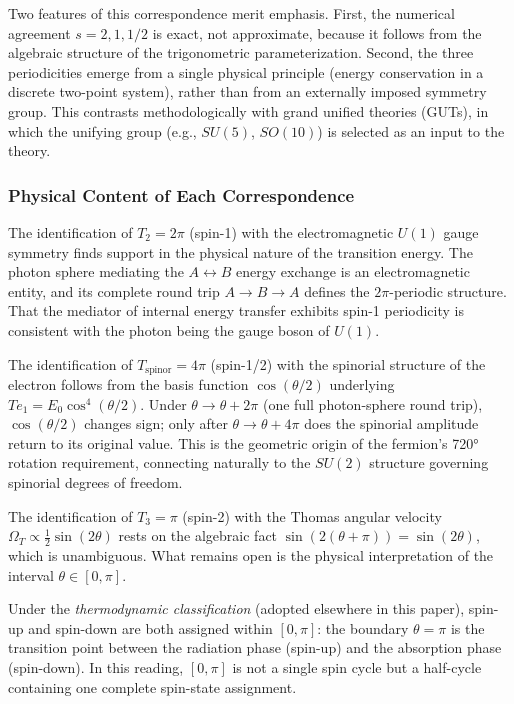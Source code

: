 \documentclass[%
 reprint,
 amsmath,amssymb,
 aps,
 prb,
]{revtex4-2}
\numberwithin{equation}{section}
\theoremstyle{definition}
\theoremstyle{remark}
\newcommand{\Uone}{U(1)}
\begin{document}
Two features of this correspondence merit emphasis. First, the numerical agreement $s = 2, 1, 1/2$ is exact, not approximate, because it follows from the algebraic structure of the trigonometric parameterization. Second, the three periodicities emerge from a single physical principle (energy conservation in a discrete two-point system), rather than from an externally imposed symmetry group. This contrasts methodologically with grand unified theories (GUTs), in which the unifying group (e.g., $SU(5)$, $SO(10)$) is selected as an input to the theory.

\subsubsection{Physical Content of Each Correspondence}

The identification of $T_2 = 2\pi$ (spin-1) with the electromagnetic $\Uone$ gauge symmetry finds support in the physical nature of the transition energy. The photon sphere mediating the $A \leftrightarrow B$ energy exchange is an electromagnetic entity, and its complete round trip $A\to B\to A$ defines the $2\pi$-periodic structure. That the mediator of internal energy transfer exhibits spin-1 periodicity is consistent with the photon being the gauge boson of $\Uone$.

The identification of $T_{\text{spinor}} = 4\pi$ (spin-1/2) with the spinorial structure of the electron follows from the basis function $\cos(\theta/2)$ underlying $Te_1 = E_0\cos^4(\theta/2)$. Under $\theta \to \theta + 2\pi$ (one full photon-sphere round trip), $\cos(\theta/2)$ changes sign; only after $\theta \to \theta + 4\pi$ does the spinorial amplitude return to its original value. This is the geometric origin of the fermion's 720° rotation requirement, connecting naturally to the $SU(2)$ structure governing spinorial degrees of freedom.

The identification of $T_3 = \pi$ (spin-2) with the Thomas angular velocity $\Omega_T \propto \tfrac{1}{2}\sin(2\theta)$ rests on the algebraic fact $\sin(2(\theta+\pi)) = \sin(2\theta)$, which is unambiguous. What remains open is the physical interpretation of the interval $\theta \in [0,\pi]$.

Under the \emph{thermodynamic classification} (adopted elsewhere in this paper), spin-up and spin-down are both assigned within $[0,\pi]$: the boundary $\theta = \pi$ is the transition point between the radiation phase (spin-up) and the absorption phase (spin-down). In this reading, $[0,\pi]$ is not a single spin cycle but a half-cycle containing one complete spin-state assignment.
\end{document}
